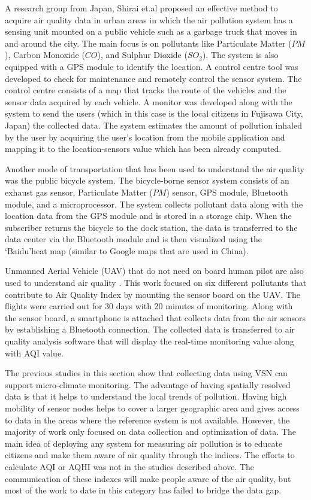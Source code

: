 A research group from Japan, Shirai et.al \cite{Shirai2016} proposed an effective method to acquire air quality data in urban areas in which the air pollution system has a sensing unit mounted on a public vehicle such as a garbage truck that moves in and around the city. The main focus is on pollutants like Particulate Matter ($PM$), Carbon Monoxide ($CO$), and Sulphur Dioxide ($SO_2$). The system is also equipped with a GPS module to identify the location. A control centre tool was developed to check for maintenance and remotely control the sensor system. The control centre consists of a map that tracks the route of the vehicles and the sensor data acquired by each vehicle. A monitor was developed along with the system to send the users (which in this case is the local citizens in Fujisawa City, Japan) the collected data. The system estimates the amount of pollution inhaled by the user by acquiring the user's location from the mobile application and mapping it to the location-sensors value which has been already computed.

Another mode of transportation that has been used to understand the air quality was the public bicycle system. The bicycle-borne sensor \cite{Xiang2016,Liu2015a} system consists of an exhaust gas sensor, Particulate Matter ($PM$) sensor, GPS module, Bluetooth module, and a microprocessor. The system collects pollutant data along with the location data from the GPS module and is stored in a storage chip. When the subscriber returns the bicycle to the dock station, the data is transferred to the data center via the Bluetooth module and is then visualized using the \lq{Baidu}\rq heat map (similar to Google maps that are used in China).


 Unmanned Aerial Vehicle (UAV)  that do not need on board human pilot are also used to understand air quality \cite{Zhi2017}. This work focused on six different pollutants that contribute to Air Quality Index by mounting the sensor board on the UAV. The flights were carried out for 30 days with 20 minutes of monitoring. Along with the sensor board, a smartphone is attached that collects data from the air sensors by establishing a Bluetooth connection. The collected data is transferred to air quality analysis software that will display the real-time monitoring value along with AQI value. 

The previous studies in this section show that collecting data using VSN can support micro-climate monitoring. The advantage of having spatially resolved data is that it helps to understand the local trends of pollution. Having high mobility of sensor nodes helps to cover a larger geographic area and gives access to data in the areas where the reference system is not available. However, the majority of work only focused on data collection and optimization of data. The main idea of deploying any system for measuring air pollution is to educate citizens and make them aware of air quality through the indices. The efforts to calculate AQI or AQHI was not in the studies described above. The communication of these indexes will make people aware of the air quality, but most of the work to date in this category has failed to bridge the data gap.


